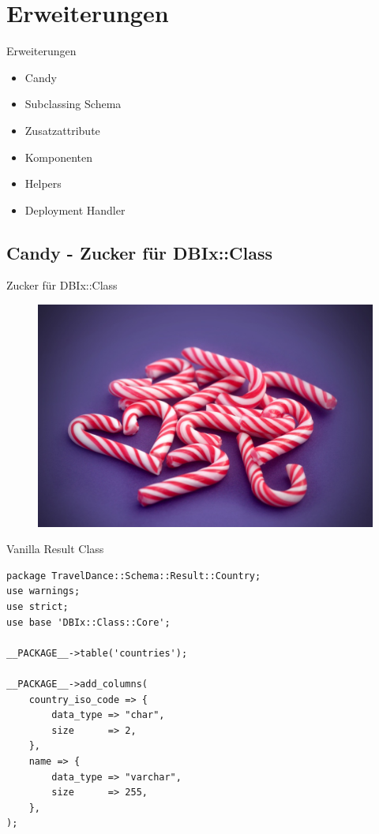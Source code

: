 \section{Erweiterungen}

\begin{frame}{Erweiterungen}
\begin{itemize}
\item Candy
\item Subclassing Schema
\item Zusatzattribute
\item Komponenten
\item Helpers
\item Deployment Handler
\end{itemize}
\end{frame}

\subsection{Candy - Zucker für DBIx::Class}

\begin{frame}{Zucker für DBIx::Class}
\begin{figure}[!ht]
\centering
\includegraphics[width=0.8\linewidth]{img/candy-cane.jpg}
\end{figure}
\end{frame}

\begin{frame}[fragile]{Vanilla Result Class}
\begin{lstlisting}
package TravelDance::Schema::Result::Country;
use warnings;
use strict;
use base 'DBIx::Class::Core';

__PACKAGE__->table('countries');

__PACKAGE__->add_columns(
    country_iso_code => {
        data_type => "char",
        size      => 2,
    },
    name => {
        data_type => "varchar",
        size      => 255,
    },
);
\end{lstlisting}
\end{frame}

